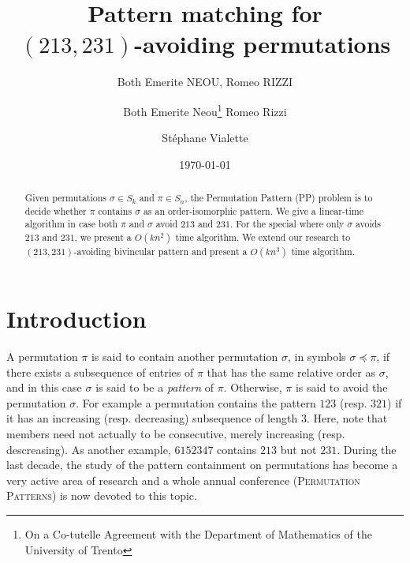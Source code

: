 \documentclass[a4paper]{llncs}
\begin{document}

\title{Pattern matching for\\ $(213,231)$-avoiding permutations}
\author{Both Emerite NEOU, Romeo RIZZI}
\date{}

\author{%
	Both Emerite Neou\thanks{On a Co-tutelle  Agreement with the Department of Mathematics of the University of Trento}
  Romeo Rizzi \and
  St\'ephane Vialette
}%

\date{\today}

\maketitle

\begin{abstract}
	Given permutations $\sigma \in S_k$ and $\pi \in S_n$, the Permutation Pattern (PP)
	problem is to decide whether $\pi$ contains $\sigma$ as an order-isomorphic pattern.
	We give a linear-time algorithm in case both $\pi$ and $\sigma$ avoid 
	$213$ and $231$. 
	For the special where only $\sigma$ avoids $213$ and $231$, we present a 
	$O(kn^2)$ time algorithm. We extend our research to $(213,231)$-avoiding 
	bivincular pattern and present a $O(kn^3)$ time algorithm.
\end{abstract}



\section{Introduction}
\label{section:Introduction}

	A permutation $\pi$ is said to contain another permutation $\sigma$,
	in symbols $\sigma \preceq \pi$,
	if there exists a subsequence of entries of $\pi$ that has the same relative
	order as $\sigma$, and in this case $\sigma$ is said to be a 
	\emph{pattern} of $\pi$.
	Otherwise, $\pi$ is said to avoid the permutation $\sigma$.
	For example a permutation contains the pattern $123$ (resp. $321$) if it has
	an increasing (resp. decreasing) subsequence of length $3$.
	Here, note that members need not actually to be consecutive, 
	merely increasing (resp. descreasing).
	As another example,
	$6152347$ contains $213$ but not $231$.
	During the last decade, the study of the pattern containment on permutations has
	become a very active area of research and
	a whole annual conference (\textsc{Permutation Patterns}) is now devoted 
	to this topic.
\end{document}
